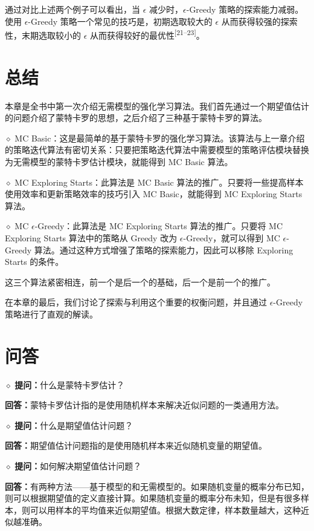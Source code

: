 通过对比上述两个例子可以看出，当 $\epsilon$ 减少时，$\epsilon$-Greedy 策略的探索能力减弱。使用 $\epsilon$-Greedy 策略一个常见的技巧是，初期选取较大的 $\epsilon$ 从而获得较强的探索性，末期选取较小的 $\epsilon$ 从而获得较好的最优性\textsuperscript{[21--23]}。

\section{总结}
\label{sec:rl-mc-summary}

本章是全书中第一次介绍无需模型的强化学习算法。我们首先通过一个期望值估计的问题介绍了蒙特卡罗的思想，之后介绍了三种基于蒙特卡罗的算法。

$\diamond$ MC Basic：这是最简单的基于蒙特卡罗的强化学习算法。该算法与上一章介绍的策略迭代算法有密切关系：只要把策略迭代算法中需要模型的策略评估模块替换为无需模型的蒙特卡罗估计模块，就能得到 MC Basic 算法。

$\diamond$ MC Exploring Starts：此算法是 MC Basic 算法的推广。只要将一些提高样本使用效率和更新策略效率的技巧引入 MC Basic，就能得到 MC Exploring Starts 算法。

$\diamond$ MC $\epsilon$-Greedy：此算法是 MC Exploring Starts 算法的推广。只要将 MC Exploring Starts 算法中的策略从 Greedy 改为 $\epsilon$-Greedy，就可以得到 MC $\epsilon$-Greedy 算法。通过这种方式增强了策略的探索能力，因此可以移除 Exploring Starts 的条件。

这三个算法紧密相连，前一个是后一个的基础，后一个是前一个的推广。

在本章的最后，我们讨论了探索与利用这个重要的权衡问题，并且通过 $\epsilon$-Greedy 策略进行了直观的解读。

\section{问答}
\label{sec:rl-mc-qa}

$\diamond$ \textbf{提问：}什么是蒙特卡罗估计？

\textbf{回答：}蒙特卡罗估计指的是使用随机样本来解决近似问题的一类通用方法。

$\diamond$ \textbf{提问：}什么是期望值估计问题？

\textbf{回答：}期望值估计问题指的是使用随机样本来近似随机变量的期望值。

$\diamond$ \textbf{提问：}如何解决期望值估计问题？

\textbf{回答：}有两种方法——基于模型的和无需模型的。如果随机变量的概率分布已知，则可以根据期望值的定义直接计算。如果随机变量的概率分布未知，但是有很多样本，则可以用样本的平均值来近似期望值。根据大数定律，样本数量越大，这种近似越准确。

